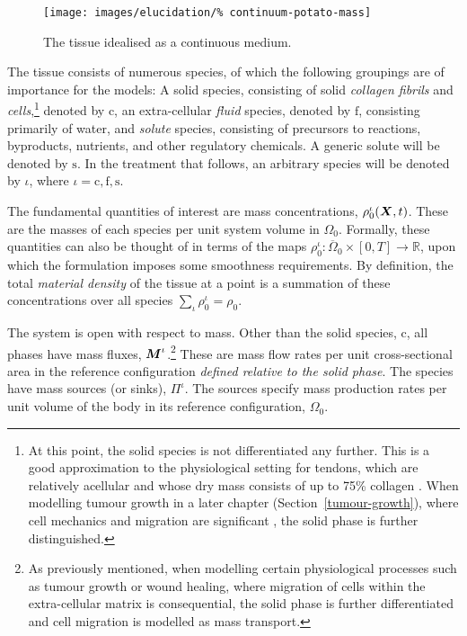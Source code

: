 \begin{figure}
  \centering
  \texttt{[image: images/elucidation/\%
    continuum-potato-mass]}
  \caption{The tissue idealised as a continuous medium.}
  \label{continuum-potato-mass}
\end{figure}

The tissue consists of numerous species, of which the following
groupings are of importance for the models: A solid species,
consisting of solid \emph{collagen fibrils} and
\emph{cells},\footnote{At this point, the solid species is not
  differentiated any further. This is a good approximation to the
  physiological setting for tendons, which are relatively acellular
  and whose dry mass consists of up to 75\% collagen
  \citep{Nordinetal:2001}. When modelling tumour growth in a later
  chapter (Section~\ref{tumour-growth}), where cell mechanics and
  migration are significant \citep{namyetal:04}, the solid phase is
  further distinguished.} denoted by $\mathrm{c}$, an extra-cellular
\emph{fluid} species, denoted by $\mathrm{f}$, consisting primarily of
water, and \emph{solute} species, consisting of precursors to
reactions, byproducts, nutrients, and other regulatory chemicals. A
generic solute will be denoted by $\mathrm{s}$. In the treatment that
follows, an arbitrary species will be denoted by $\iota$, where $\iota
= \mathrm{c,f,s}$.

The fundamental quantities of interest are mass concentrations,
$\rho_0^\iota(\mbox{\boldmath$ X$},t)$. These are the masses of each species per unit
system volume in $\Omega_0$. Formally, these quantities can also be
thought of in terms of the maps $\rho_0^\iota: \overline{\Omega}_0
\times [0,T] \rightarrow \mathbb{R}$, upon which the formulation
imposes some smoothness requirements. By definition, the total {\em
  material density} of the tissue at a point is a summation of these
concentrations over all species $\sum\limits_{\iota}\rho_0^\iota =
\rho_0$.

The system is open with respect to mass. Other than the solid species,
$\mathrm{c}$, all phases have mass fluxes, $\mbox{\boldmath$ M$}^\iota$.\footnote{As
  previously mentioned, when modelling certain physiological processes
  such as tumour growth or wound healing, where migration of cells
  within the extra-cellular matrix is consequential, the solid phase
  is further differentiated and cell migration is modelled as mass
  transport.}  These are mass flow rates per unit cross-sectional area
in the reference configuration \emph{defined relative to the solid
  phase}. The species have mass sources (or sinks), $\Pi^\iota$. The
sources specify mass production rates per unit volume of the body in
its reference configuration, $\Omega_0$.

